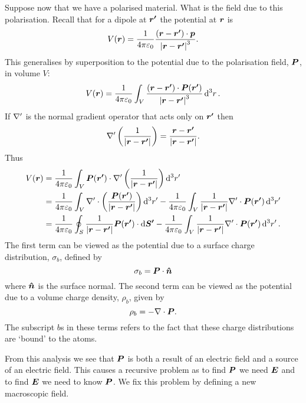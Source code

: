     Suppose now that we have a polarised material.
    What is the field due to this polarisation.
    Recall that for a dipole at \(\bm{r'}\) the potential at \(\bm{r}\) is
    \[V(\bm{r}) = \frac{1}{4\pi\varepsilon_0} \frac{(\bm{r} - \bm{r'})\cdot\bm{p}}{\abs{\bm{r} - \bm{r'}}^3}.\]
    This generalises by superposition to the potential due to the polarisation field, \(\bm{P}\), in volume \(V\):
    \[V(\bm{r}) = \frac{1}{4\pi\varepsilon_0} \int_V \frac{(\bm{r} - \bm{r'})\cdot\bm{P}(\bm{r'})}{\abs{\bm{r} - \bm{r'}}^3}\dd[3]{r}.\]
    If \(\nabla'\) is the normal gradient operator that acts only on \(\bm{r'}\) then
    \[\nabla'\left(\frac{1}{\abs{\bm{r} - \bm{r'}}}\right) = \frac{\bm{r} - \bm{r'}}{\abs{\bm{r} - \bm{r'}}}.\]
    Thus
    \begin{align*}
        V(\bm{r}) &= \frac{1}{4\pi\varepsilon_0} \int_V \bm{P}(\bm{r'})\cdot\nabla'\left(\frac{1}{\abs{\bm{r} - \bm{r'}}}\right)\dd[3]{r'}\\
        &= \frac{1}{4\pi\varepsilon_0} \int_V \nabla' \cdot \left(\frac{\bm{P}(\bm{r'})}{\abs{\bm{r} - \bm{r'}}}\right)\dd[3]{r'} - \frac{1}{4\pi\varepsilon_0} \int_V \frac{1}{\abs{\bm{r} - \bm{r'}}} \nabla'\cdot\bm{P}(\bm{r'}) \dd[3]{r'}\\
        &= \frac{1}{4\pi\varepsilon_0} \oint_S \frac{1}{\abs{\bm{r} - \bm{r'}}}\bm{P}(\bm{r'}) \cdot \dd{\bm{S'}} - \frac{1}{4\pi\varepsilon_0}\int_V \frac{1}{\abs{\bm{r} - \bm{r'}}} \nabla'\cdot\bm{P}(\bm{r'})\dd[3]{r'}.
    \end{align*}
    The first term can be viewed as the potential due to a surface charge distribution, \(\sigma_b\), defined by
    \[\sigma_b = \bm{P}\cdot\bm{\hat{n}}\]
    where \(\bm{\hat{n}}\) is the surface normal.
    The second term can be viewed as the potential due to a volume charge density, \(\rho_b\), given by
    \[\rho_b = -\nabla\cdot\bm{P}.\]
    The subscript \(b\)s in these terms refers to the fact that these charge distributions are `bound' to the atoms.
    
    From this analysis we see that \(\bm{P}\) is both a result of an electric field and a source of an electric field.
    This causes a recursive problem as to find \(\bm{P}\) we need \(\bm{E}\) and to find \(\bm{E}\) we need to know \(\bm{P}\).
    We fix this problem by defining a new macroscopic field.
    
